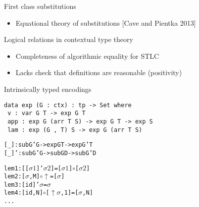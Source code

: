 \documentclass[usenames,dvipsnames]{beamer}
\begin{document}
\begin{frame}{First class substitutions}
\begin{itemize}
\item Equational theory of substitutions
[Cave and Pientka 2013]
\end{itemize}
\end{frame}

\begin{frame}{Logical relations in contextual type theory}
\begin{itemize}
\item Completeness of algorithmic equality for STLC
\item Lacks check that definitions are reasonable (positivity)
\end{itemize}
\end{frame}

\begin{frame}[fragile]{Intrinsically typed encodings}
\begin{verbatim}
data exp (G : ctx) : tp -> Set where
 v : var G T -> exp G T
 app : exp G (arr T S) -> exp G T -> exp S
 lam : exp (G , T) S -> exp G (arr T S)
\end{verbatim}
\pause
\begin{alltt}
[_] : sub G' G -> exp G T -> exp G' T
[_]' : sub G' G -> sub G D -> sub G' D
\end{alltt}
\pause
\begin{alltt}
lem1 : [ [ \(\sigma1\) ]' \(\sigma2\) ] = [ \(\sigma1\) ] \(\circ\) [ \(\sigma2\) ]
lem2 : [ \(\sigma\) , M ] \(\circ\) \(\uparrow\) = [ \(\sigma\) ]
lem3 : [ id ]' \(\sigma\) = \(\sigma\)
lem4 : [ id , N ] \(\circ\) [ \(\uparrow\) \(\sigma\), 1] = [ \(\sigma\) , N ]
...
\end{alltt}
\end{frame}
\end{document}
